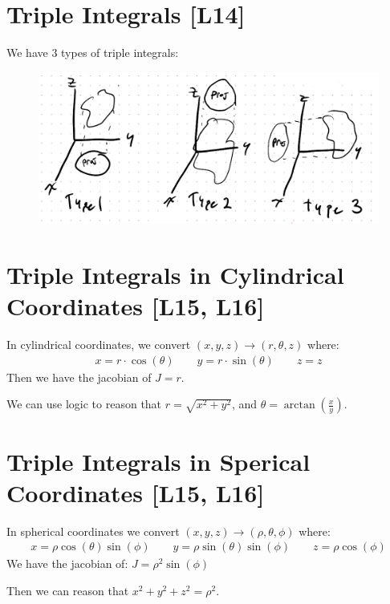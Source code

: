 \documentclass[12pt,letterpaper]{article} \usepackage{amsmath} \usepackage{graphicx} \usepackage[margin=1in]{geometry} \usepackage{longtable}  \usepackage{amssymb}
\begin{document}
	\section{Triple Integrals [L14]}
	We have 3 types of triple integrals:
	
	\begin{figure}[H]
		\centering
		\includegraphics[width=0.7\linewidth]{screenshot001}
	\end{figure}
	
	\section{Triple Integrals in Cylindrical Coordinates [L15, L16]}
	In cylindrical coordinates, we convert $(x,y,z) \to (r,\theta, z)$ where:
	\begin{align*}
		x = r\cdot \cos(\theta) \qquad y = r\cdot \sin(\theta) \qquad z = z
	\end{align*}
	Then we have the jacobian of $J=r$.
	
	We can use logic to reason that $r =\sqrt{x^2+y^2}$, and $\theta = \arctan\left(\frac{x}{y}\right)$.
	
	\section{Triple Integrals in Sperical Coordinates [L15, L16]}
	In spherical coordinates we convert $(x,y,z) \to (\rho, \theta, \phi)$ where:
	\begin{align*}
		x = \rho \cos(\theta) \sin(\phi) \qquad y = \rho \sin(\theta) \sin(\phi) \qquad z = \rho \cos(\phi)
	\end{align*}
	We have the jacobian of: $J = \rho^2 \sin(\phi)$
	
	Then we can reason that $x^2 + y^2 + z^2 = \rho ^2$.
	
	
	
\end{document}
